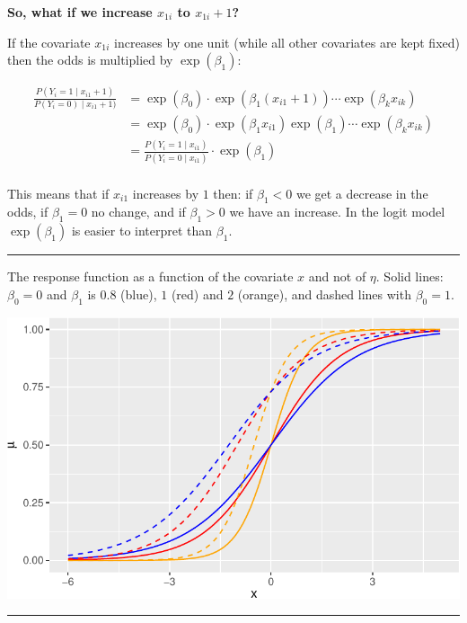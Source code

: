 \documentclass[
  letterpaper,
  DIV=11,
  numbers=noendperiod]{scrartcl}
\begin{document}
\textbf{So, what if we increase \(x_{1i}\) to \(x_{1i}+1\)?}

If the covariate \(x_{1i}\) increases by one unit (while all other
covariates are kept fixed) then the odds is multiplied by
\(\exp(\beta_1)\):

\begin{align*}
\frac{P(Y_i=1\mid x_{i1}+1)}{P(Y_i=0)\mid x_{i1}+1)}&=\exp(\beta_0)\cdot \exp(\beta_1 (x_{i1}+1))\cdots\exp(\beta_k x_{ik})\\
&=\exp(\beta_0)\cdot \exp(\beta_1 x_{i1})\exp(\beta_1)\cdots\exp(\beta_k x_{ik})\\
&=\frac{P(Y_i=1\mid x_{i1})}{P(Y_i=0\mid x_{i1})}\cdot \exp(\beta_1)\\
\end{align*}

This means that if \(x_{i1}\) increases by \(1\) then: if \(\beta_1<0\)
we get a decrease in the odds, if \(\beta_1=0\) no change, and if
\(\beta_1>0\) we have an increase. In the logit model \(\exp(\beta_1)\)
is easier to interpret than \(\beta_1\).

\begin{center}\rule{0.5\linewidth}{0.5pt}\end{center}

The response function as a function of the covariate \(x\) and not of
\(\eta\). Solid lines: \(\beta_0=0\) and \(\beta_1\) is \(0.8\) (blue),
\(1\) (red) and \(2\) (orange), and dashed lines with \(\beta_0=1\).

\includegraphics{L10_files/figure-pdf/unnamed-chunk-3-1.pdf}

\begin{center}\rule{0.5\linewidth}{0.5pt}\end{center}
\end{document}
